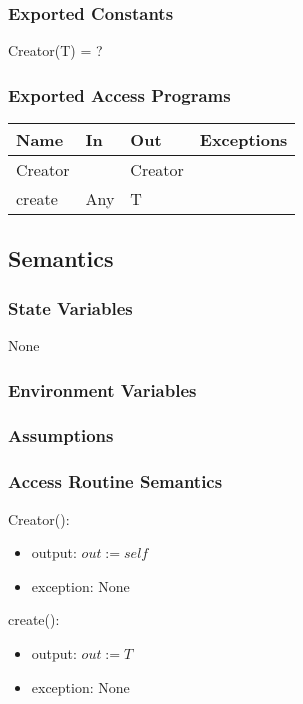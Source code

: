 \documentclass[12pt, titlepage]{article}
\begin{document}
\subsubsection{Exported Constants}
Creator(T) = ?
\subsubsection{Exported Access Programs}

\begin{center}
	\begin{tabular}{p{2cm} p{4cm} p{4cm} p{2cm}}
		\hline
		\textbf{Name} & \textbf{In} & \textbf{Out} & \textbf{Exceptions} \\
		\hline
		Creator &  & Creator &  \\
		create & Any & T &  \\
		\hline
	\end{tabular}
\end{center}

\subsection{Semantics}

\subsubsection{State Variables}
None

\subsubsection{Environment Variables}

\subsubsection{Assumptions}

\subsubsection{Access Routine Semantics}

\noindent Creator():
\begin{itemize}
	\item output: $out := self$
	\item exception: None
\end{itemize}

\noindent create():
\begin{itemize}
	\item output: $out := T$
	\item exception: None
\end{itemize}
\end{document}
